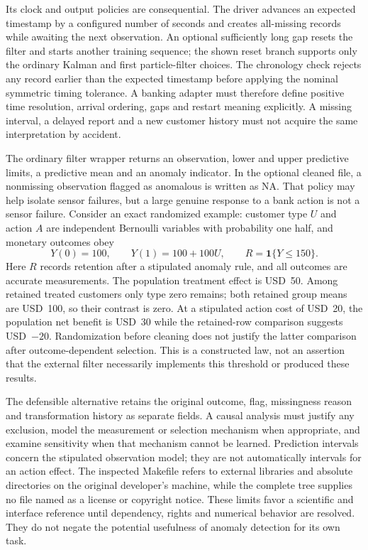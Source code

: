 Its clock and output policies are consequential. The driver advances an
expected timestamp by a configured number of seconds and creates all-missing
records while awaiting the next observation. An optional sufficiently long
gap resets the filter and starts another training sequence; the shown reset
branch supports only the ordinary Kalman and first particle-filter choices.
The chronology check rejects any record earlier than the expected timestamp
before applying the nominal symmetric timing tolerance. A banking adapter must
therefore define positive time resolution, arrival ordering, gaps and restart
meaning explicitly. A missing interval, a delayed report and a new customer
history must not acquire the same interpretation by accident. \citep{rel19eisadbn}

The ordinary filter wrapper returns an observation, lower and upper predictive
limits, a predictive mean and an anomaly indicator. In the optional cleaned
file, a nonmissing observation flagged as anomalous is written as NA. That
policy may help isolate sensor failures, but a large genuine response to a
bank action is not a sensor failure. Consider an exact randomized example:
customer type $U$ and action $A$ are independent Bernoulli variables with
probability one half, and monetary outcomes obey
\begin{equation}
 Y(0)=100,\qquad Y(1)=100+100U,\qquad
 R=\mathbf 1\{Y\leq150\}.
 \label{rel19:cleaning}
\end{equation}
Here $R$ records retention after a stipulated anomaly rule, and all outcomes
are accurate measurements. The population treatment effect is USD~50.
Among retained treated customers only type zero remains; both retained group
means are USD~100, so their contrast is zero. At a stipulated action cost of
USD~20, the population net benefit is USD~30 while the retained-row comparison
suggests USD~$-20$. Randomization before cleaning does not justify the latter
comparison after outcome-dependent selection. This is a constructed law,
not an assertion that the external filter necessarily implements this threshold
or produced these results. \citep{rel19dbnwitness}

The defensible alternative retains the original outcome, flag, missingness
reason and transformation history as separate fields. A causal analysis must
justify any exclusion, model the measurement or selection mechanism when
appropriate, and examine sensitivity when that mechanism cannot be learned.
Prediction intervals concern the stipulated observation model; they are not
automatically intervals for an action effect. The inspected Makefile refers
to external libraries and absolute directories on the original developer's
machine, while the complete tree supplies no file named as a license or
copyright notice. These limits favor a scientific and interface reference
until dependency, rights and numerical behavior are resolved. They do not
negate the potential usefulness of anomaly detection for its own task.
\citep{rel19eisadbn}

